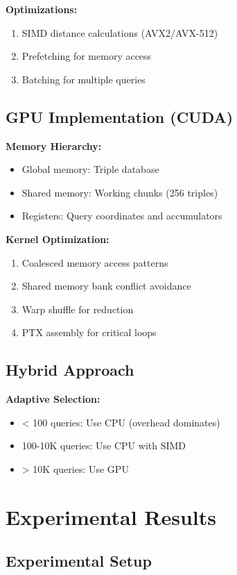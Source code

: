 \documentclass{article}
\begin{document}
\textbf{Optimizations:}
\begin{enumerate}
    \item SIMD distance calculations (AVX2/AVX-512)
    \item Prefetching for memory access
    \item Batching for multiple queries
\end{enumerate}

\subsection{GPU Implementation (CUDA)}

\textbf{Memory Hierarchy:}
\begin{itemize}
    \item Global memory: Triple database
    \item Shared memory: Working chunks (256 triples)
    \item Registers: Query coordinates and accumulators
\end{itemize}

\textbf{Kernel Optimization:}
\begin{enumerate}
    \item Coalesced memory access patterns
    \item Shared memory bank conflict avoidance
    \item Warp shuffle for reduction
    \item PTX assembly for critical loops
\end{enumerate}

\subsection{Hybrid Approach}

\textbf{Adaptive Selection:}
\begin{itemize}
    \item < 100 queries: Use CPU (overhead dominates)
    \item 100-10K queries: Use CPU with SIMD
    \item > 10K queries: Use GPU
\end{itemize}

\section{Experimental Results}

\subsection{Experimental Setup}
\end{document}
